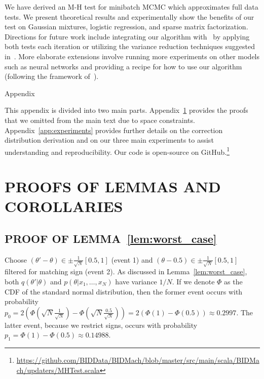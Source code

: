 \documentclass[letterpaper]{article}
\begin{document}
We have derived an M-H test for minibatch MCMC which approximates full data
tests. We present theoretical results and experimentally show the benefits of
our test on Gaussian mixtures, logistic regression, and sparse matrix
factorization.  Directions for future work include integrating our algorithm
with~\citep{cutting_mh_2014} by applying both tests each iteration or utilizing
the variance reduction techniques suggested in~\citep{DBLP:conf/icml/ChenG16}.
More elaborate extensions involve running more experiments on other models such
as neural networks and providing a recipe for how to use our algorithm
(following the framework of~\citep{sgmcmc_2015}).






\clearpage
\appendix


\onecolumn
\begin{center}
{\Large Appendix}
\end{center}

This appendix is divided into two main parts. Appendix~\ref{app:proofs} provides
the proofs that we omitted from the main text due to space constraints.
Appendix~\ref{app:experiments} provides further details on the correction
distribution derivation and on our three main experiments to assist
understanding and reproducibility. Our code is open-source on
GitHub.\footnote{\url{https://github.com/BIDData/BIDMach/blob/master/src/main/scala/BIDMach/updaters/MHTest.scala}}


\section{PROOFS OF LEMMAS AND COROLLARIES}\label{app:proofs}

\subsection{PROOF OF LEMMA~\ref{lem:worst_case}}\label{app:worst_case_proof}

Choose $(\theta' - \theta) \in \pm\frac{1}{\sqrt{N}}[0.5,1]$ (event 1) and
$(\theta -0.5) \in \pm\frac{1}{\sqrt{N}}[0.5,1]$ filtered for  matching sign
(event 2).  As discussed in Lemma~\ref{lem:worst_case}, both $q(\theta' |
\theta)$ and $p(\theta | x_1,\ldots,x_N)$ have variance $1/N$. If we denote
$\Phi$ as the CDF of the standard normal distribution, then the former event
occurs with probability $p_0 = 2(\Phi(\sqrt{N}\frac{1}{\sqrt{N}}) -
\Phi(\sqrt{N}\frac{0.5}{\sqrt{N}})) = 2(\Phi(1)-\Phi(0.5)) \approx 0.2997$. The
latter event, because we restrict signs, occurs with probability $p_1 =
\Phi(1)-\Phi(0.5) \approx 0.14988$. 
\end{document}

